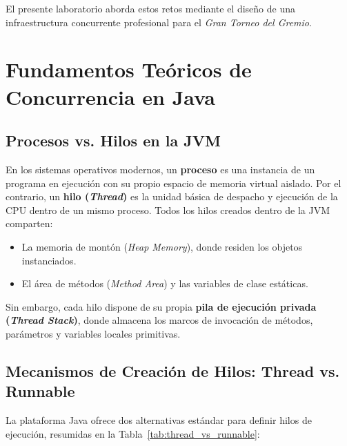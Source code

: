 \documentclass[11pt,letterpaper]{article}
\begin{document}
El presente laboratorio aborda estos retos mediante el diseño de una infraestructura concurrente profesional para el \textit{Gran Torneo del Gremio}.

\section{Fundamentos Teóricos de Concurrencia en Java}

\subsection{Procesos vs. Hilos en la JVM}
En los sistemas operativos modernos, un \textbf{proceso} es una instancia de un programa en ejecución con su propio espacio de memoria virtual aislado. Por el contrario, un \textbf{hilo (\textit{Thread})} es la unidad básica de despacho y ejecución de la CPU dentro de un mismo proceso. Todos los hilos creados dentro de la JVM comparten:
\begin{itemize}
    \item La memoria de montón (\textit{Heap Memory}), donde residen los objetos instanciados.
    \item El área de métodos (\textit{Method Area}) y las variables de clase estáticas.
\end{itemize}
Sin embargo, cada hilo dispone de su propia \textbf{pila de ejecución privada (\textit{Thread Stack})}, donde almacena los marcos de invocación de métodos, parámetros y variables locales primitivas.

\subsection{Mecanismos de Creación de Hilos: Thread vs. Runnable}
La plataforma Java ofrece dos alternativas estándar para definir hilos de ejecución, resumidas en la Tabla~\ref{tab:thread_vs_runnable}:
\end{document}
